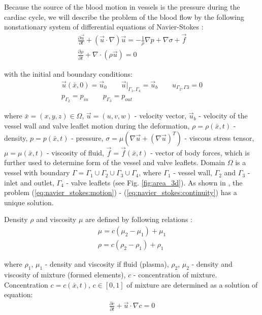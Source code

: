 \documentclass[runningheads,a4paper]{llncs}
\begin{document}
Because the source of the blood motion in vessels is the pressure during the cardiac cycle, we will describe the problem of the blood flow
by the following nonstationary system of differential equations of Navier-Stokes \cite{gummel}:
\begin{gather}
    \label{eq:navier_stokes:motion}
    \frac{\partial \vec{u}}{\partial t} + (\vec{u} \cdot \nabla) \vec{u} = - \frac{1}{\rho} \nabla p + \nabla \sigma + \vec{f}\\
    \label{eq:navier_stokes:continuity}
    \frac{\partial \rho}{\partial t} + \nabla \cdot (\rho \vec{u}) = 0 
\end{gather}

with the initial and boundary conditions:
\begin{gather}
    \label{eq:navier_stokes:velocity_conditions}
    \vec{u}(\bar{x}, 0) = \vec{u}_0 \qquad \vec{u}|_{\Gamma_1, \Gamma_4} = \vec{u}_b \qquad u_{\Gamma_2, \Gamma3} = 0\\
    \label{eq:navier_stokes:pressure_conditions}
    p_{\Gamma_2} = p_{in} \qquad p_{\Gamma_3} = p_{out}
\end{gather}

where $\bar{x}=(x,y,z) \in \Omega$, $\vec{u}=(u,v,w)$ - velocity vector, $\vec{u}_b$ - velocity of the vessel wall and valve leaflet motion during the deformation,
$\rho=\rho(\bar{x}, t)$ - density, $p=p(\bar{x}, t)$ - pressure, $\sigma = \mu (\nabla \vec{u} + (\nabla \vec{u})^T)$ - viscous stress tensor,
$\mu = \mu(\bar{x}, t)$ - viscosity of fluid, $\vec{f} = \vec{f}(\bar{x}, t)$ - vector of body forces, which is further used to determine form of the vessel and valve leaflets.
Domain $\Omega$ is a vessel with boundary $\Gamma = \Gamma_1 \cup \Gamma_2 \cup \Gamma_3 \cup \Gamma_4$, where $\Gamma_1$ - vessel wall, $\Gamma_2$ and $\Gamma_3$ - inlet and outlet, $\Gamma_4$ - valve leaflets (see Fig. \ref{fig:area_3d}).
As shown in \cite{ragulin}, the problem (\ref{eq:navier_stokes:motion}) - (\ref{eq:navier_stokes:continuity}) has a unique solution.

Density $\rho$ and viscosity $\mu$ are defined by following relations \cite{gummel}:
\begin{gather}
    \label{eq:viscosity}
    \mu = c (\mu_2 - \mu_1) + \mu_1\\
    \label{eq:density}
    \rho = c (\rho_2 - \rho_1) + \rho_1
\end{gather}

where $\rho_1$, $\mu_1$ - density and viscosity if fluid (plasma), $\rho_2$, $\mu_2$ - density and viscosity of mixture (formed elements), $c$ - concentration of mixture. Concentration $c=c(\bar{x}, t)$, $c \in [0, 1]$ of mixture are determined as a solution of equation:
\begin{gather}
    \label{eq:convection}
    \frac{\partial c}{\partial t} + \vec{u} \cdot \nabla c = 0
\end{gather}
\end{document}
